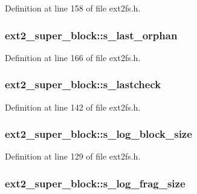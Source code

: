 \-Definition at line 158 of file ext2fs.\-h.

\hypertarget{structext2__super__block_a48682cfbe704f555d18fe030f1ee6fe6}{
\subsubsection[{s\-\_\-last\-\_\-orphan}]{ {\bf ext2\-\_\-super\-\_\-block\-::s\-\_\-last\-\_\-orphan}}}\label{structext2__super__block_a48682cfbe704f555d18fe030f1ee6fe6}


\-Definition at line 166 of file ext2fs.\-h.

\hypertarget{structext2__super__block_a4a8a628c48e36668f87ff1d0f831224a}{
\subsubsection[{s\-\_\-lastcheck}]{ {\bf ext2\-\_\-super\-\_\-block\-::s\-\_\-lastcheck}}}\label{structext2__super__block_a4a8a628c48e36668f87ff1d0f831224a}


\-Definition at line 142 of file ext2fs.\-h.

\hypertarget{structext2__super__block_a34965ad64787db6bf0893e000b19f608}{
\subsubsection[{s\-\_\-log\-\_\-block\-\_\-size}]{ {\bf ext2\-\_\-super\-\_\-block\-::s\-\_\-log\-\_\-block\-\_\-size}}}\label{structext2__super__block_a34965ad64787db6bf0893e000b19f608}


\-Definition at line 129 of file ext2fs.\-h.

\hypertarget{structext2__super__block_a441780f5356cad879e465bb23d5c0659}{
\subsubsection[{s\-\_\-log\-\_\-frag\-\_\-size}]{ {\bf ext2\-\_\-super\-\_\-block\-::s\-\_\-log\-\_\-frag\-\_\-size}}}\label{structext2__super__block_a441780f5356cad879e465bb23d5c0659}


